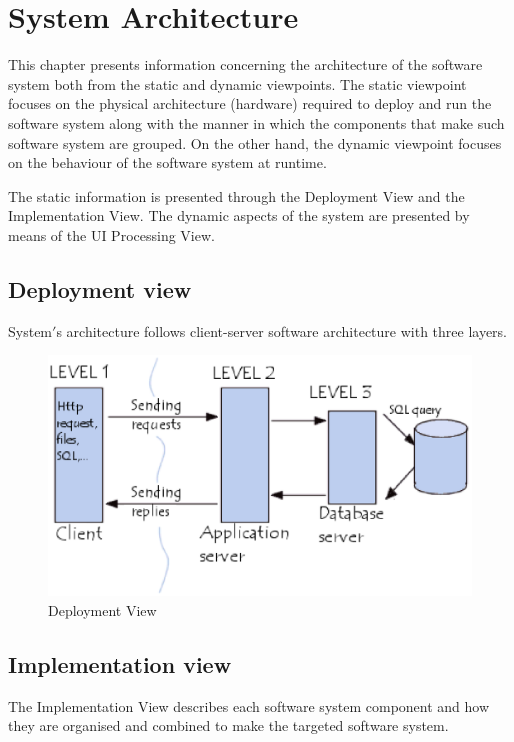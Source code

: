 \chapter{System Architecture}
\label{chap:arch}

This chapter presents information concerning the architecture of the software
system both from the static and dynamic viewpoints. The static viewpoint focuses
on the physical architecture (hardware) required to deploy and run the
software system along with the manner in which the components that make such
software system are grouped. On the other hand, the dynamic viewpoint focuses on
the behaviour of the software system at runtime. 

The static information is presented through the \gls{Deployment View} and the
\gls{Implementation View}. The dynamic aspects of the system are presented by
means of the \gls{UI Processing View}.


\section{Deployment view}
System$'$s architecture follows client-server software
architecture with three layers.

\begin{figure}
\begin{center}
\includegraphics[width=\textwidth]{./images/c4deploymentview.eps}
\end{center}
\caption{Deployment View}
\label{fig:Deployment View}
\end{figure} 



\section{Implementation view}
The \gls{Implementation View} describes each software system component and how
they are organised and combined to make the targeted software system.




